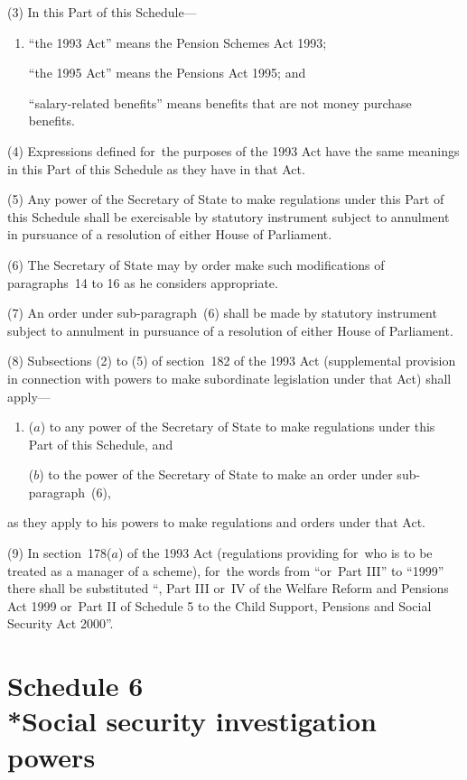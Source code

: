 \documentclass[12pt,a4paper]{article}
\begin{document}
(3) In this Part of this Schedule—
\begin{enumerate}\item[]
    “the 1993 Act” means the Pension Schemes Act 1993;

    “the 1995 Act” means the Pensions Act 1995; and

    “salary-related benefits” means benefits that are not money purchase benefits.~
\end{enumerate}

(4) Expressions defined for~the purposes of the 1993 Act have the same meanings in this Part of this Schedule as they have in that Act.

(5) Any power of the Secretary of State to make regulations under this Part of this Schedule shall be exercisable by statutory instrument subject to annulment in pursuance of a resolution of either House of Parliament.

(6) The Secretary of State may by order make such modifications of paragraphs~14 to 16 as he considers appropriate.

(7) An order under sub-paragraph~(6)  shall be made by statutory instrument subject to annulment in pursuance of a resolution of either House of Parliament.

(8) Subsections (2)  to (5)  of section~182 of the 1993 Act (supplemental provision in connection with powers to make subordinate legislation under that Act) shall apply—
\begin{enumerate}\item[]
($a$) to any power of the Secretary of State to make regulations under this Part of this Schedule, and

($b$) to the power of the Secretary of State to make an order under sub-paragraph~(6),
\end{enumerate}
as they apply to his powers to make regulations and orders under that Act.

(9) In section~178($a$)  of the 1993 Act (regulations providing for~who is to be treated as a manager of a scheme), for~the words from “or~Part III” to “1999” there shall be substituted “, Part III or~IV of the Welfare Reform and Pensions Act 1999 or~Part II of Schedule 5 to the Child Support, Pensions and Social Security Act 2000”. 

\vfill

\part[Schedule 6 --- Social security investigation powers]{Schedule 6\\*Social security investigation powers}
\end{document}

